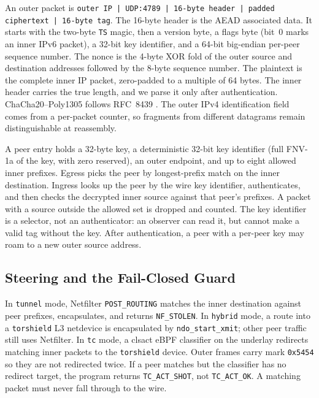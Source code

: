 \documentclass[conference]{IEEEtran}
\newcommand{\code}[1]{\texttt{#1}}
\begin{document}
An outer packet is \code{outer IP | UDP:4789 | 16-byte header | padded ciphertext | 16-byte tag}. The 16-byte header is the AEAD associated data. It starts with the two-byte \code{TS} magic, then a version byte, a flags byte (bit~0 marks an inner IPv6 packet), a 32-bit key identifier, and a 64-bit big-endian per-peer sequence number. The nonce is the 4-byte XOR fold of the outer source and destination addresses followed by the 8-byte sequence number. The plaintext is the complete inner IP packet, zero-padded to a multiple of 64 bytes. The inner header carries the true length, and we parse it only after authentication. ChaCha20--Poly1305 follows RFC~8439 \cite{nir2018rfc8439}. The outer IPv4 identification field comes from a per-packet counter, so fragments from different datagrams remain distinguishable at reassembly.

A peer entry holds a 32-byte key, a deterministic 32-bit key identifier (full FNV-1a of the key, with zero reserved), an outer endpoint, and up to eight allowed inner prefixes. Egress picks the peer by longest-prefix match on the inner destination. Ingress looks up the peer by the wire key identifier, authenticates, and then checks the decrypted inner source against that peer's prefixes. A packet with a source outside the allowed set is dropped and counted. The key identifier is a selector, not an authenticator: an observer can read it, but cannot make a valid tag without the key. After authentication, a peer with a per-peer key may roam to a new outer source address.

\subsection{Steering and the Fail-Closed Guard}
In \code{tunnel} mode, Netfilter \code{POST\_ROUTING} matches the inner destination against peer prefixes, encapsulates, and returns \code{NF\_STOLEN}. In \code{hybrid} mode, a route into a \code{torshield} L3 netdevice is encapsulated by \code{ndo\_start\_xmit}; other peer traffic still uses Netfilter. In \code{tc} mode, a clsact eBPF classifier on the underlay redirects matching inner packets to the \code{torshield} device. Outer frames carry mark \code{0x5454} so they are not redirected twice. If a peer matches but the classifier has no redirect target, the program returns \code{TC\_ACT\_SHOT}, not \code{TC\_ACT\_OK}. A matching packet must never fall through to the wire.
\end{document}
